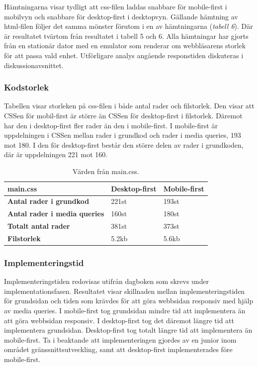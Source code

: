 \documentclass[11pt]{article}
\begin{document}
Hämtningarna visar tydligt att css-filen laddas snabbare för mobile-first i mobilvyn och snabbare för desktop-first i desktopvyn. Gällande hämtning av html-filen följer det samma mönster förutom i en av hämtningarna (\textit{tabell 6}). Där är resultatet tvärtom från resultatet i tabell 5 och 6. Alla hämtningar har gjorts från en stationär dator med en emulator som renderar om webbläsarens storlek för att passa vald enhet. Utförligare analys angående responstiden diskuteras i diskussionavsnittet.
\newpage
\subsubsection{Kodstorlek}

Tabellen visar storleken på css-filen i både antal rader och filstorlek. Den visar att CSSen för mobil-first är större än CSSen för desktop-first i filstorlek. Däremot har den i desktop-first fler rader än den i mobile-first. I mobile-first är uppdelningen i CSSen mellan rader i grundkod och rader i media queries, 193 mot 180. I den för desktop-first består den större delen av rader i grundkoden, där är uppdelningen 221 mot 160.

\begin{table}[H]
	\centering
	\begin{tabular}{|p{6cm}|p{2.7cm}|p{2.4cm}|}
	\hline
	\textbf{main.css}&\textbf{Desktop-first}&\textbf{Mobile-first}\\ \hline
	\textbf{Antal rader i grundkod}&221st&193st\\ \hline
	\textbf{Antal rader i media queries}&160st&180st\\ \hline
	\textbf{Totalt antal rader}&381st&373st\\ \hline
	\textbf{Filstorlek}&5.2kb&5.6kb\\ \hline
	\end{tabular}
    \caption {Värden från main.css.}
\end{table}

\subsubsection{Implementeringstid}

Implementeringstiden redovisas utifrån dagboken som skrevs under implementationsfasen. Resultatet visar skillnaden mellan implementeringstiden för grundsidan och tiden som krävdes för att göra webbsidan responsiv med hjälp av media queries. I mobile-first tog grundsidan mindre tid att implementera än att göra webbsidan responsiv. I desktop-first tog det däremot längre tid att implementera grundsidan. Desktop-first tog totalt längre tid att implementera än mobile-first. Ta i beaktande att implementeringen gjordes av en junior inom området gränssnittsutveckling, samt att desktop-first implementerades före mobile-first.
\end{document}
